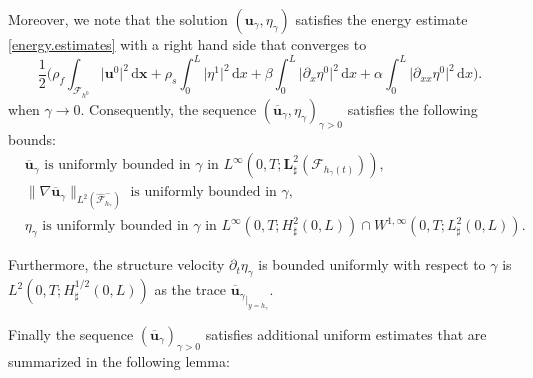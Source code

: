 \documentclass[10pt]{amsart}
\let\mathcal\mathscr
\theoremstyle{remark}
\theoremstyle{definition}
\newcommand{\ug}{\boldsymbol{u}}
\newcommand{\xg}{\boldsymbol{x}}
\newcommand{\dd}{\,\mathrm{d}}
\newcommand{\BS}[1]{\boldsymbol{#1}}
\begin{document}
Moreover, we note that the solution $(\ug_{\gamma},\eta_{\gamma})$ satisfies the energy estimate \eqref{energy.estimates} with a right hand side that converges to
\[
\frac{1}{2}\biggl(\rho_{f}\int_{\mathcal{F}_{h^0}}\vert\ug^0\vert^{2} \dd \xg+ \rho_{s}\int_{0}^{L}\vert\eta^1\vert^{2}\dd x+\beta\int_{0}^{L}\vert\partial_{x}\eta^0\vert^{2}\dd x+\alpha\int_{0}^{L}\vert\partial_{xx}\eta^0\vert^{2}\dd x\biggr).
\]
when $\gamma \to 0$.
Consequently, the sequence $(\overline{\ug}_{\gamma},\eta_{\gamma})_{\gamma >0}$ satisfies the following bounds:
\begin{align}
&\overline{\ug}_{\gamma}\text{ is uniformly bounded in }\gamma\text{ in }L^{\infty}(0,T;\BS{L}_\sharp^{2}(\mathcal{F}_{h_{\gamma}(t)})),\label{bound-u-1}\\
&\|\nabla\overline{\ug}_{\gamma}\|_{L^2(\widehat{\mathcal F}^{-}_{h_{\gamma}})} \text{ is uniformly bounded in }\gamma,
\label{bound-u-2}\\
&\eta_{\gamma}\text{ is uniformly bounded in }\gamma\text{ in }L^{\infty}(0,T;H^{2}_{\sharp}(0,L))\cap W^{1,\infty}(0,T;L_\sharp^{2}(0,L)).\label{est-eta}
\end{align}

Furthermore, the structure velocity $\partial_t\eta_\gamma$ is bounded uniformly with respect to $\gamma$ is $L^2(0, T ; H^{1/2}_\sharp(0, L))$ as the trace ${\overline{\ug}_{\gamma}}_{\vert_{y=h_{\gamma}}}$.

Finally the sequence $(\overline{\ug}_{\gamma})_{\gamma>0}$ satisfies additional uniform estimates that are summarized in the following lemma:
\end{document}
